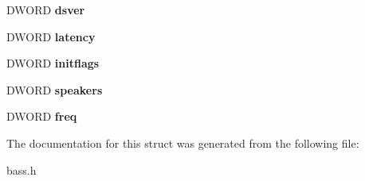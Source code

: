 \begin{DoxyCompactItemize}
\item 
\hypertarget{structBASS__INFO_af8cabba039215c378dd6fd6ef0bf8e9f}{}D\+W\+O\+R\+D {\bfseries dsver}\label{structBASS__INFO_af8cabba039215c378dd6fd6ef0bf8e9f}

\item 
\hypertarget{structBASS__INFO_ab54c862f3f10d31df27541c83682c883}{}D\+W\+O\+R\+D {\bfseries latency}\label{structBASS__INFO_ab54c862f3f10d31df27541c83682c883}

\item 
\hypertarget{structBASS__INFO_a7c73adb1a84b1c7b2af2da81694e24da}{}D\+W\+O\+R\+D {\bfseries initflags}\label{structBASS__INFO_a7c73adb1a84b1c7b2af2da81694e24da}

\item 
\hypertarget{structBASS__INFO_a5b563d324e9551ab98ce9888c5277f72}{}D\+W\+O\+R\+D {\bfseries speakers}\label{structBASS__INFO_a5b563d324e9551ab98ce9888c5277f72}

\item 
\hypertarget{structBASS__INFO_a72d42df53abce9b0fd676aa220b377ad}{}D\+W\+O\+R\+D {\bfseries freq}\label{structBASS__INFO_a72d42df53abce9b0fd676aa220b377ad}

\end{DoxyCompactItemize}


The documentation for this struct was generated from the following file\+:\begin{DoxyCompactItemize}
\item 
bass.\+h\end{DoxyCompactItemize}
